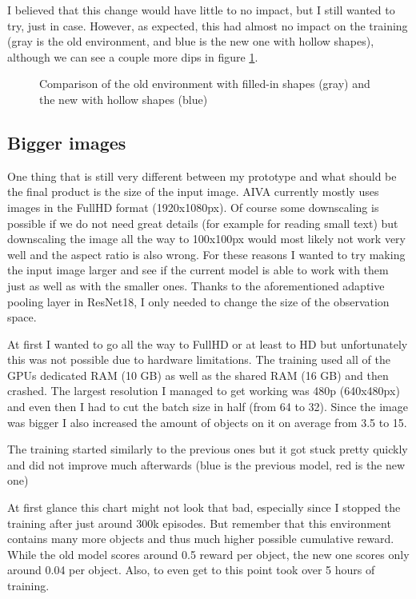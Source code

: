 \documentclass[
  digital,     %
  oneside,     %
  nosansbold,  %
  nocolorbold, %
  lof,         %
  lot,         %
]{fithesis4}
\begin{document}
I believed that this change would have little to no impact, but I still wanted to try, just in case. However, as expected, this had almost no impact on the training (gray is the old environment, and blue is the new one with hollow shapes), although we can see a couple more dips in figure \ref{fig:v5}.

\begin{figure}
    \centering
    \makebox[\textwidth][c]{}
    \caption{Comparison of the old environment with filled-in shapes (gray) and the new with hollow shapes (blue)}
    \label{fig:v5}
\end{figure}

\subsection{Bigger images}
One thing that is still very different between my prototype and what should be the final product is the size of the input image. AIVA currently mostly uses images in the FullHD format (1920x1080px). Of course some downscaling is possible if we do not need great details (for example for reading small text) but downscaling the image all the way to 100x100px would most likely not work very well and the aspect ratio is also wrong. For these reasons I wanted to try making the input image larger and see if the current model is able to work with them just as well as with the smaller ones. Thanks to the aforementioned adaptive pooling layer in ResNet18, I only needed to change the size of the observation space.

At first I wanted to go all the way to FullHD or at least to HD but unfortunately this was not possible due to hardware limitations. The training used all of the GPUs dedicated RAM (10 GB) as well as the shared RAM (16 GB) and then crashed. The largest resolution I managed to get working was 480p (640x480px) and even then I had to cut the batch size in half (from 64 to 32). Since the image was bigger I also increased the amount of objects on it on average from 3.5 to 15.

The training started similarly to the previous ones but it got stuck pretty quickly and did not improve much afterwards (blue is the previous model, red is the new one)

At first glance this chart might not look that bad, especially since I stopped the training after just around 300k episodes. But remember that this environment contains many more objects and thus much higher possible cumulative reward. While the old model scores around 0.5 reward per object, the new one scores only around 0.04 per object. Also, to even get to this point took over 5 hours of training.
\end{document}

